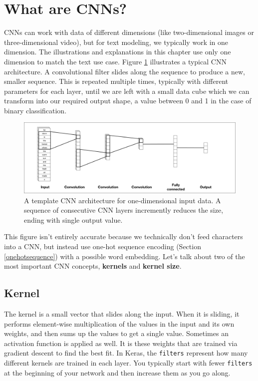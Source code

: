 \documentclass[
]{krantz}
\begin{document}
\hypertarget{what-are-cnns}{%
\section{What are CNNs?}\label{what-are-cnns}}

CNNs can work with data of different dimensions (like two-dimensional images or three-dimensional video), but for text modeling, we typically work in one dimension. The illustrations and explanations in this chapter use only one dimension to match the text use case.
Figure \ref{fig:cnn-architecture} illustrates a typical CNN architecture.
A convolutional filter slides along the sequence to produce a new, smaller sequence. This is repeated multiple times, typically with different parameters for each layer, until we are left with a small data cube which we can transform into our required output shape, a value between 0 and 1 in the case of binary classification.

\begin{figure}

{\centering \includegraphics[width=1\linewidth]{diagram-files/cnn-architecture} 

}

\caption{A template CNN architecture for one-dimensional input data. A sequence of consecutive CNN layers incremently reduces the size, ending with single output value.}\label{fig:cnn-architecture}
\end{figure}

This figure isn't entirely accurate because we technically don't feed characters into a CNN, but instead use one-hot sequence encoding (Section \ref{onehotsequence}) with a possible word embedding.
Let's talk about two of the most important CNN concepts, \textbf{kernels} and \textbf{kernel size}.

\hypertarget{kernel}{%
\subsection{Kernel}\label{kernel}}

The kernel is a small vector that slides along the input. When it is sliding, it performs element-wise multiplication of the values in the input and its own weights, and then sums up the values to get a single value.
Sometimes an activation function is applied as well.
It is these weights that are trained via gradient descent to find the best fit.
In Keras, the \texttt{filters} represent how many different kernels are trained in each layer. You typically start with fewer \texttt{filters} at the beginning of your network and then increase them as you go along.
\end{document}
